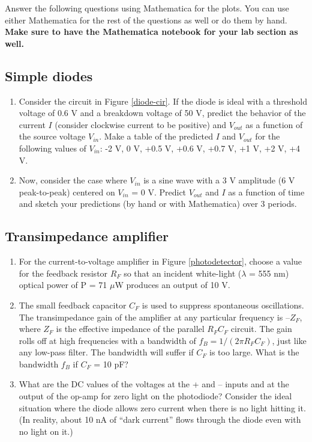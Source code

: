 \documentclass[10pt]{PhysLab1C} %
\begin{document}
Answer the following questions using Mathematica for the plots. You can use either Mathematica for the rest
of the questions as well or do them by hand. \textbf{Make sure to have the Mathematica notebook for your lab
section as well.}

\subsection{Simple diodes}

\label{simp-diodes}

\begin{enumerate}
    \item Consider the circuit in Figure \ref{diode-cir}. If the diode is ideal with a threshold voltage of 0.6 V and a
breakdown voltage of 50 V, predict the behavior of the current $I$ (consider clockwise
current to be positive) and $V_{out}$ as a function of the source voltage $V_{in}$. Make a table of
the predicted $I$ and $V_{out}$ for the following values of $V_{in}$: -2 V, 0 V, +0.5 V, +0.6 V, +0.7 V, +1 V, +2 V, +4 V.
\item Now, consider the case where $V_{in}$ is a sine wave with a 3 V amplitude (6 V peak-to-peak)
centered on $V_{in}$ = 0 V. Predict $V_{out}$ and $I$ as a function of time and sketch your predictions
(by hand or with Mathematica) over 3 periods.
\end{enumerate}

\subsection{Transimpedance amplifier}

\label{trans-pre}

\begin{enumerate}
    \item 
    For the current-to-voltage amplifier in Figure \ref{photodetector}, choose a value for the feedback resistor $R_F$
so that an incident white-light ($\lambda$ = 555 nm) optical power of P = 71 $\mu$W produces an
output of 10 V.
\item 
The small feedback capacitor $C_F$ is used to suppress spontaneous oscillations. The transimpedance gain of the amplifier at any particular frequency is $–Z_F$, where $Z_F$ is the effective
impedance of the parallel $R_FC_F$ circuit. The gain rolls off at high frequencies with a
bandwidth of $f_B = 1/(2\pi R_FC_F)$, just like any low-pass filter. The bandwidth will suffer if $C_F$ is
too large. What is the bandwidth $f_B$ if $C_F$ = 10 pF?
\item
What are the DC values of the voltages at the + and – inputs and at the output of the op-amp for zero light on the photodiode? Consider the ideal situation where the diode allows
zero current when there is no light hitting it. (In reality, about 10 nA of “dark current”
flows through the diode even with no light on it.)
\end{enumerate}
\end{document}
